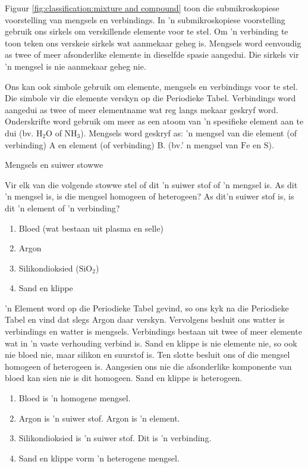 \label{m38708*eip-487} Figuur \ref{fig:classification:mixture and compound} toon die submikroskopiese voorstelling van mengsels en verbindings. In 'n submikroskopiese voorstelling gebruik ons sirkels om verskillende elemente voor te stel. Om 'n verbinding te toon teken ons verskeie sirkels wat aanmekaar geheg is. Mengsels word eenvoudig as twee of meer afsonderlike elemente in dieselfde spasie aangedui. Die sirkels vir 'n mengsel is nie aanmekaar geheg nie.\par 
\label{m38708*id0124}Ons kan ook simbole gebruik om elemente, mengsels en verbindings voor te stel. Die simbole vir die elemente verskyn op die Periodieke Tabel. Verbindings word aangedui as twee of meer elementname wat reg langs mekaar geskryf word. Onderskrifte word gebruik om meer as een atoom van 'n spesifieke element aan te dui (bv. $\text{H}{}_{2}\text{O}$ of $\text{NH}_{3}$). Mengsels word geskryf as: 'n mengsel van die element (of verbinding) A en element (of verbinding) B. (bv.' n mengsel van $\text{Fe}$ en $\text{S}$).\par 
\label{m38708*eip-524}
      \begin{wex}
{Mengsels en suiwer stowwe}
{Vir elk van die volgende stowwe stel of dit 'n suiwer stof of 'n mengsel is. As dit 'n mengsel is, is die mengsel homogeen of heterogeen? As dit'n suiwer stof is, is dit 'n element of 'n verbinding?
\label{m38708*eip-id1167351497334}\begin{enumerate}[noitemsep, label=\textbf{\alph*}. ] 
\item Bloed (wat bestaan uit plasma en selle)
\item Argon
\item Silikondioksied ($\text{SiO}{}_{2}$)
\item Sand en klippe
\end{enumerate}
  }
{
'n Element word op die Periodieke Tabel gevind, so ons kyk na die Periodieke Tabel en vind dat slegs Argon daar verskyn. Vervolgens besluit ons watter is verbindings en watter is mengsels. Verbindings bestaan uit twee of meer elemente wat in 'n vaste verhouding verbind is. Sand en klippe is nie elemente nie, so ook nie bloed nie, maar silikon en suurstof is. Ten slotte besluit ons of die mengsel homogeen of heterogeen is. Aangesien ons nie die afsonderlike komponente van bloed kan sien nie is dit homogeen. Sand en klippe is heterogeen.
{}
\begin{enumerate}
[noitemsep, label=\textbf{\alph*}. ]
\item Bloed is 'n homogene mengsel.
\item Argon is 'n suiwer stof. Argon is 'n element.
\item Silikondioksied is 'n suiwer stof. Dit is 'n verbinding.
\item Sand en klippe vorm 'n heterogene mengsel.
\end{enumerate}}
    \end{wex}
